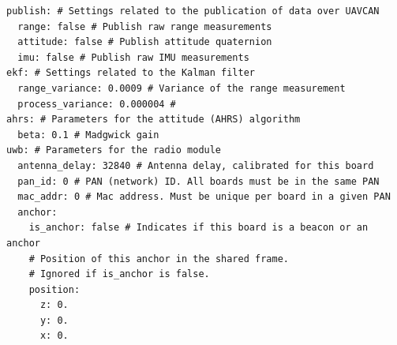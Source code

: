 \begin{verbatim}
publish: # Settings related to the publication of data over UAVCAN
  range: false # Publish raw range measurements
  attitude: false # Publish attitude quaternion
  imu: false # Publish raw IMU measurements
ekf: # Settings related to the Kalman filter
  range_variance: 0.0009 # Variance of the range measurement
  process_variance: 0.000004 #
ahrs: # Parameters for the attitude (AHRS) algorithm
  beta: 0.1 # Madgwick gain
uwb: # Parameters for the radio module
  antenna_delay: 32840 # Antenna delay, calibrated for this board
  pan_id: 0 # PAN (network) ID. All boards must be in the same PAN
  mac_addr: 0 # Mac address. Must be unique per board in a given PAN
  anchor:
    is_anchor: false # Indicates if this board is a beacon or an anchor
    # Position of this anchor in the shared frame.
    # Ignored if is_anchor is false.
    position:
      z: 0.
      y: 0.
      x: 0.
\end{verbatim}
